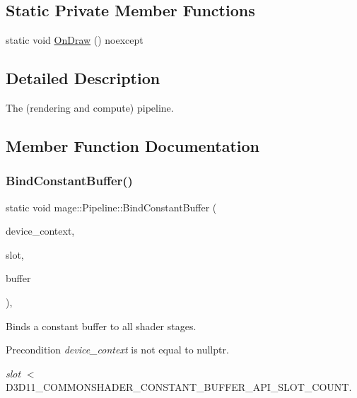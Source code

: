 \subsection*{Static Private Member Functions}
\begin{DoxyCompactItemize}
\item 
static void \hyperlink{structmage_1_1_pipeline_a8d88f7c1e6e436c55fc7947334efaa9e}{On\+Draw} () noexcept
\end{DoxyCompactItemize}


\subsection{Detailed Description}
The (rendering and compute) pipeline. 

\subsection{Member Function Documentation}
\hypertarget{structmage_1_1_pipeline_ab4bfc69d98005a1e929c8a6b33fa07b1}{}\label{structmage_1_1_pipeline_ab4bfc69d98005a1e929c8a6b33fa07b1} 
\subsubsection{\texorpdfstring{Bind\+Constant\+Buffer()}{BindConstantBuffer()}}
{\footnotesize\ttfamily static void mage\+::\+Pipeline\+::\+Bind\+Constant\+Buffer (\begin{DoxyParamCaption}\item[{I\+D3\+D11\+Device\+Context4 $\ast$}]{device\+\_\+context,  }\item[{\hyperlink{namespacemage_a41c104c036fba3756a74e19f793eeaa1}{U32}}]{slot,  }\item[{I\+D3\+D11\+Buffer $\ast$}]{buffer }\end{DoxyParamCaption})\hspace{0.3cm}{\ttfamily [static]}, {\ttfamily [noexcept]}}

Binds a constant buffer to all shader stages.

\begin{DoxyPrecond}{Precondition}
{\itshape device\+\_\+context} is not equal to {\ttfamily nullptr}. 

{\itshape slot} $<$ {\ttfamily D3\+D11\+\_\+\+C\+O\+M\+M\+O\+N\+S\+H\+A\+D\+E\+R\+\_\+\+C\+O\+N\+S\+T\+A\+N\+T\+\_\+\+B\+U\+F\+F\+E\+R\+\_\+\+A\+P\+I\+\_\+\+S\+L\+O\+T\+\_\+\+C\+O\+U\+NT}. 
\end{DoxyPrecond}

